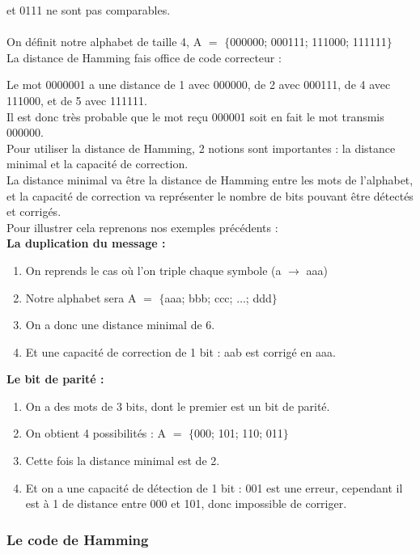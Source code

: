 \documentclass[12pt]{article}
\begin{document}
 et 0111 ne sont pas comparables.
\\
\\ On définit notre alphabet de taille 4, A $=$ $\{$000000; 000111; 111000; 111111$\}$
\\ La distance de Hamming fais office de code correcteur :

\tab Le mot 0000001 a une distance de 1 avec 000000, de 2 avec 000111, de 4 avec 111000, et de 5 avec 111111.
\\ Il est donc très probable que le mot reçu 000001 soit en fait le mot transmis 000000.
\\

\tab Pour utiliser la distance de Hamming, 2 notions sont importantes : la distance minimal et la capacité de correction.
\\ La distance minimal va être la distance de Hamming entre les mots de l’alphabet, et la capacité de correction va représenter le nombre de bits pouvant être détectés et corrigés.
\\

\tab Pour illustrer cela reprenons nos exemples précédents :
\\
\textbf{La duplication du message :}
\begin{enumerate}
  \item[] On reprends le cas où l’on triple chaque symbole (a $\rightarrow$ aaa)
  \item[] Notre alphabet sera A $=$ $\{$aaa; bbb; ccc; $\ldots$; ddd$\}$
  \item[] On a donc une distance minimal de 6.
  \item[] Et une capacité de correction de 1 bit : aab est corrigé en aaa.
\end{enumerate}


\textbf{Le bit de parité :}
\begin{enumerate}
  \item[] On a des mots de 3 bits, dont le premier est un bit de parité.
  \item[] On obtient 4 possibilités : A $=$ $\{$000; 101; 110; 011$\}$
  \item[] Cette fois la distance minimal est de 2.
  \item[] Et on a une capacité de détection de 1 bit : 001 est une erreur, cependant il est à 1 de distance entre 000 et 101, donc impossible de corriger.
\end{enumerate}

\subsubsection{Le code de Hamming}
\label{subs:Le code de Hamming}
\end{document}

